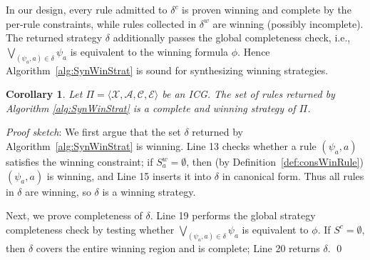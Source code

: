 \documentclass[review]{elsarticle}
\newcommand{\set}[1]{\{ #1 \}}
\newcommand{\tuple}[1]{\langle {#1} \rangle}
\newcommand{\statevar}{\mathcal{X}}
\newcommand{\act}{\mathcal{A}}
\newcommand{\constraint}{\mathcal{C}}
\newcommand{\estate}{\mathcal{E}}
\newenvironment{proofsketch}{\textit{Proof sketch}:}{\qed}
\newcommand{\red}{\color{red}}
\newtheorem{corollary}{Corollary}
\begin{document}

{\red In our design, every rule admitted to $\delta^c$ is proven winning and complete by the per-rule constraints, while rules collected in $\delta^w$ are winning (possibly incomplete). The returned strategy $\delta$ additionally passes the global completeness check, i.e., $\bigvee_{(\psi_a, a) \in \delta} \psi_a$ is equivalent to the winning formula $\phi$. Hence Algorithm~\ref{alg:SynWinStrat} is sound for synthesizing winning strategies.}

\begin{corollary} \label{cor:winStr}
	Let $\Pi = \tuple{\statevar, \act, \constraint, \estate}$ be an ICG.
	The set of rules returned by Algorithm \ref{alg:SynWinStrat} is a complete and winning strategy of $\Pi$.
\end{corollary}

\begin{proofsketch}
{\red We first argue that the set $\delta$ returned by Algorithm~\ref{alg:SynWinStrat} is winning. Line 13 checks whether a rule $(\psi_a,a)$ satisfies the winning constraint; if $S^w_a = \emptyset$, then (by Definition~\ref{def:consWinRule}) $(\psi_a,a)$ is winning, and Line 15 inserts it into $\delta$ in canonical form. Thus all rules in $\delta$ are winning, so $\delta$ is a winning strategy.}

{\red Next, we prove completeness of $\delta$. Line 19 performs the global strategy completeness check by testing whether $\bigvee_{(\psi_a,a)\in\delta}\psi_a$ is equivalent to $\phi$. If $S^c = \emptyset$, then $\delta$ covers the entire winning region and is complete; Line 20 returns $\delta$.}
\end{proofsketch}
\end{document}
